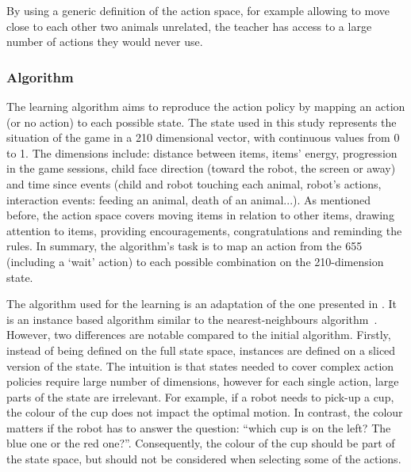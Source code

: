 
By using a generic definition of the action space, for example allowing to move close to each other two animals unrelated, the teacher has access to a large number of actions they would never use. 

\subsubsection{Algorithm}
The learning algorithm aims to reproduce the action policy by mapping an action (or no action) to each possible state. The state used in this study represents the situation of the game in a 210 dimensional vector, with continuous values from 0 to 1. The dimensions include: distance between items, items' energy, progression in the game sessions, child face direction (toward the robot, the screen or away) and time since events (child and robot touching each animal, robot's actions, interaction events: feeding an animal, death of an animal...). As mentioned before, the action space covers moving items in relation to other items, drawing attention to items, providing encouragements, congratulations and reminding the rules. In summary, the algorithm's task is to map an action from the 655 (including a `wait' action) to each possible combination on the 210-dimension state. 

The algorithm used for the learning is an adaptation of the one presented in \cite{senft2017toward}. It is an instance based algorithm similar to the nearest-neighbours algorithm~\citep{cover1967nearest}. However, two differences are notable compared to the initial algorithm. %
Firstly, instead of being defined on the full state space, instances are defined on a sliced version of the state. The intuition is that states needed to cover complex action policies require large number of dimensions, however for each single action, large parts of the state are irrelevant. For example, if a robot needs to pick-up a cup, the colour of the cup does not impact the optimal motion. In contrast, the colour matters if the robot has to answer the question: ``which cup is on the left? The blue one or the red one?''. Consequently, the colour of the cup should be part of the state space, but should not be considered when selecting some of the actions. 

